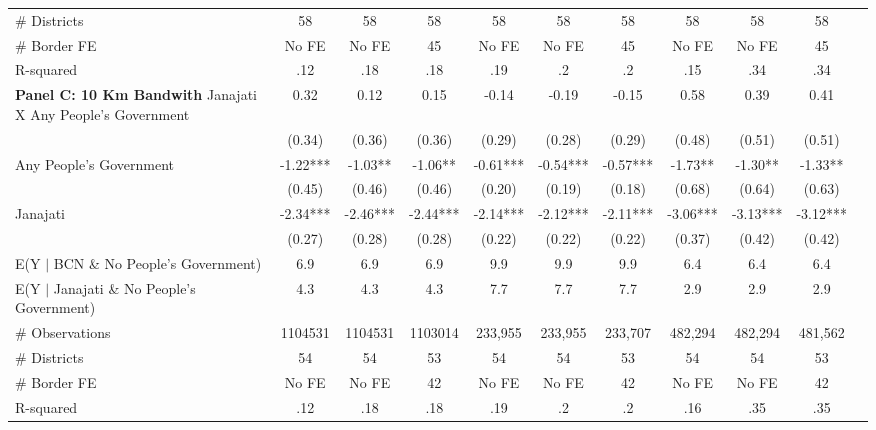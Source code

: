 \begin{tabular}{l*{10}{c}}
\# Districts        &          58   &          58   &          58   &          58   &          58   &          58   &          58   &          58   &          58   \\
\# Border FE        &       No FE   &       No FE   &          45   &       No FE   &       No FE   &          45   &       No FE   &       No FE   &          45   \\
R-squared           &         .12   &         .18   &         .18   &         .19   &          .2   &          .2   &         .15   &         .34   &         .34   \\
\midrule
\textbf{Panel C: 10 Km Bandwith}
\midrule
Janajati X Any People's Government&        0.32   &        0.12   &        0.15   &       -0.14   &       -0.19   &       -0.15   &        0.58   &        0.39   &        0.41   \\
                    &      (0.34)   &      (0.36)   &      (0.36)   &      (0.29)   &      (0.28)   &      (0.29)   &      (0.48)   &      (0.51)   &      (0.51)   \\
Any People's Government&       -1.22***&       -1.03** &       -1.06** &       -0.61***&       -0.54***&       -0.57***&       -1.73** &       -1.30** &       -1.33** \\
                    &      (0.45)   &      (0.46)   &      (0.46)   &      (0.20)   &      (0.19)   &      (0.18)   &      (0.68)   &      (0.64)   &      (0.63)   \\
Janajati            &       -2.34***&       -2.46***&       -2.44***&       -2.14***&       -2.12***&       -2.11***&       -3.06***&       -3.13***&       -3.12***\\
                    &      (0.27)   &      (0.28)   &      (0.28)   &      (0.22)   &      (0.22)   &      (0.22)   &      (0.37)   &      (0.42)   &      (0.42)   \\
\midrule
E(Y $|$ BCN \& No People's Government)&         6.9   &         6.9   &         6.9   &         9.9   &         9.9   &         9.9   &         6.4   &         6.4   &         6.4   \\
E(Y $|$ Janajati \& No People's Government)&         4.3   &         4.3   &         4.3   &         7.7   &         7.7   &         7.7   &         2.9   &         2.9   &         2.9   \\
\# Observations     &     1104531   &     1104531   &     1103014   &     233,955   &     233,955   &     233,707   &     482,294   &     482,294   &     481,562   \\
\# Districts        &          54   &          54   &          53   &          54   &          54   &          53   &          54   &          54   &          53   \\
\# Border FE        &       No FE   &       No FE   &          42   &       No FE   &       No FE   &          42   &       No FE   &       No FE   &          42   \\
R-squared           &         .12   &         .18   &         .18   &         .19   &          .2   &          .2   &         .16   &         .35   &         .35   \\
\bottomrule
\end{tabular}
